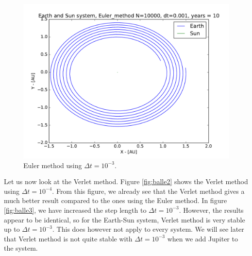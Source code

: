 \documentclass[12pt]{article}
\begin{document}
\begin{figure}[!h]
\centering
\includegraphics[width=\linewidth]{Plots/Earth_Sun_Euler_method_larger_dt.pdf}
\caption{Euler method using $\Delta t = 10^{-3}$.}
\label{fig:balle1}
\end{figure}


Let us now look at the Verlet method. Figure \ref{fig:balle2} shows the Verlet method using $\Delta t = 10^{-4}$. From this figure, we already see that the Verlet method gives a much better result compared to the ones using the Euler method. In figure \ref{fig:balle3}, we have increased the step length to $\Delta t = 10^{-3}$. However, the results appear to be identical, so for the Earth-Sun system, Verlet method is very stable up to $\Delta t = 10^{-3}$. This does however not apply to every system. We will see later that Verlet method is not quite stable with $\Delta t = 10^{-3}$ when we add Jupiter to the system.

\end{document}
